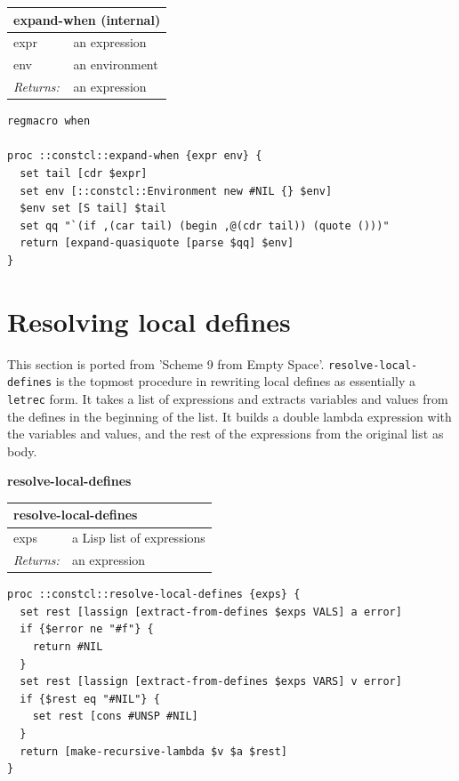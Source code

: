 \documentclass[twoside,9pt]{report}
\begin{document}
\begin{tabular}{ |l l| }
\hline
\multicolumn{2}{|l|}{expand-when (internal)} \\
\hline
expr & an expression \\
env & an environment \\
\textit{Returns:} & an expression \\
\hline
\end{tabular}

\noindent\makebox[\linewidth]{\rule{\linewidth}{0.4pt}}
\begin{lstlisting}
regmacro when
 
proc ::constcl::expand-when {expr env} {
  set tail [cdr $expr]
  set env [::constcl::Environment new #NIL {} $env]
  $env set [S tail] $tail
  set qq "`(if ,(car tail) (begin ,@(cdr tail)) (quote ()))"
  return [expand-quasiquote [parse $qq] $env]
}
\end{lstlisting}
\noindent\makebox[\linewidth]{\rule{\linewidth}{0.4pt}}
\section{Resolving local defines}
\label{resolving-local-defines}

This section is ported from 'Scheme 9 from Empty Space'. \texttt{resolve-local-defines} is the topmost procedure in rewriting local defines as essentially a \texttt{letrec} form. It takes a list of expressions and extracts variables and values from the defines in the beginning of the list. It builds a double lambda expression with the variables and values, and the rest of the expressions from the original list as body.


\textbf{resolve-local-defines}

\begin{tabular}{ |l l| }
\hline
\multicolumn{2}{|l|}{resolve-local-defines} \\
\hline
exps & a Lisp list of expressions \\
\textit{Returns:} & an expression \\
\hline
\end{tabular}

\noindent\makebox[\linewidth]{\rule{\linewidth}{0.4pt}}
\begin{lstlisting}
proc ::constcl::resolve-local-defines {exps} {
  set rest [lassign [extract-from-defines $exps VALS] a error]
  if {$error ne "#f"} {
    return #NIL
  }
  set rest [lassign [extract-from-defines $exps VARS] v error]
  if {$rest eq "#NIL"} {
    set rest [cons #UNSP #NIL]
  }
  return [make-recursive-lambda $v $a $rest]
}
\end{lstlisting}
\noindent\makebox[\linewidth]{\rule{\linewidth}{0.4pt}}
\end{document}
